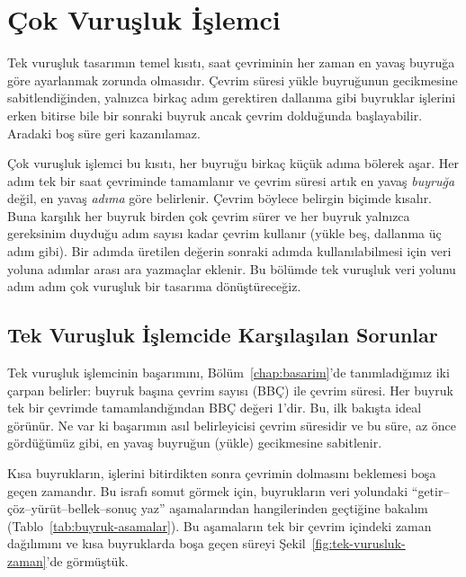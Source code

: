 
\section{Çok Vuruşluk İşlemci}
\label{sec:cok-vurusluk}

Tek vuruşluk tasarımın temel kısıtı, saat çevriminin her zaman en yavaş buyruğa göre ayarlanmak zorunda olmasıdır. Çevrim süresi yükle buyruğunun gecikmesine sabitlendiğinden, yalnızca birkaç adım gerektiren dallanma gibi buyruklar işlerini erken bitirse bile bir sonraki buyruk ancak çevrim dolduğunda başlayabilir. Aradaki boş süre geri kazanılamaz.

Çok vuruşluk işlemci bu kısıtı, her buyruğu birkaç küçük adıma bölerek aşar. Her adım tek bir saat çevriminde tamamlanır ve çevrim süresi artık en yavaş \emph{buyruğa} değil, en yavaş \emph{adıma} göre belirlenir. Çevrim böylece belirgin biçimde kısalır. Buna karşılık her buyruk birden çok çevrim sürer ve her buyruk yalnızca gereksinim duyduğu adım sayısı kadar çevrim kullanır (yükle beş, dallanma üç adım gibi). Bir adımda üretilen değerin sonraki adımda kullanılabilmesi için veri yoluna adımlar arası ara yazmaçlar eklenir. Bu bölümde tek vuruşluk veri yolunu adım adım çok vuruşluk bir tasarıma dönüştüreceğiz.

\subsection{Tek Vuruşluk İşlemcide Karşılaşılan Sorunlar}
\label{subsec:tek-vurusluk-sorunlar}

Tek vuruşluk işlemcinin başarımını, Bölüm~\ref{chap:basarim}'de tanımladığımız iki çarpan belirler: buyruk başına çevrim sayısı (BBÇ) ile çevrim süresi. Her buyruk tek bir çevrimde tamamlandığından BBÇ değeri 1'dir. Bu, ilk bakışta ideal görünür. Ne var ki başarımın asıl belirleyicisi çevrim süresidir ve bu süre, az önce gördüğümüz gibi, en yavaş buyruğun (yükle) gecikmesine sabitlenir.

Kısa buyrukların, işlerini bitirdikten sonra çevrimin dolmasını beklemesi boşa geçen zamandır. Bu israfı somut görmek için, buyrukların veri yolundaki ``getir--çöz--yürüt--bellek--sonuç yaz'' aşamalarından hangilerinden geçtiğine bakalım (Tablo~\ref{tab:buyruk-asamalar}). Bu aşamaların tek bir çevrim içindeki zaman dağılımını ve kısa buyruklarda boşa geçen süreyi Şekil~\ref{fig:tek-vurusluk-zaman}'de görmüştük.

